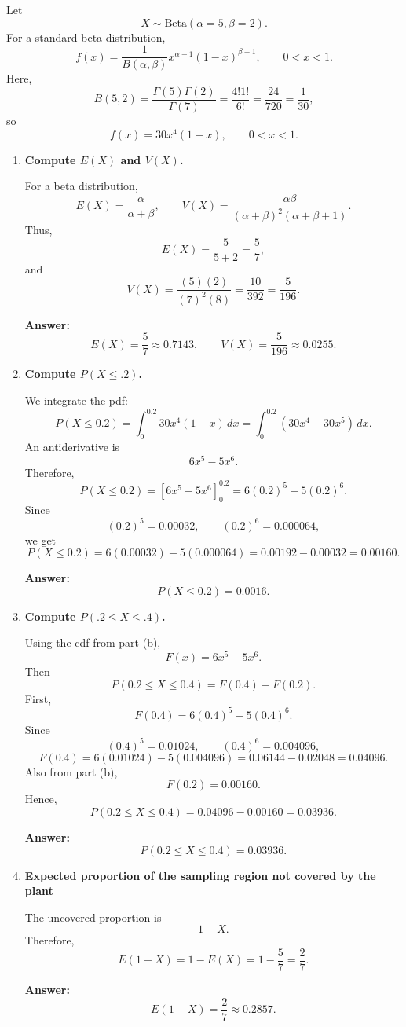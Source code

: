 \documentclass[11pt]{article}
\begin{document}
Let
\[
X\sim \text{Beta}(\alpha=5,\beta=2).
\]
For a standard beta distribution,
\[
f(x)=\frac{1}{B(\alpha,\beta)}x^{\alpha-1}(1-x)^{\beta-1}, \qquad 0<x<1.
\]
Here,
\[
B(5,2)=\frac{\Gamma(5)\Gamma(2)}{\Gamma(7)}=\frac{4!1!}{6!}=\frac{24}{720}=\frac{1}{30},
\]
so
\[
f(x)=30x^4(1-x), \qquad 0<x<1.
\]

\begin{enumerate}
    \item[(a)] \textbf{Compute $E(X)$ and $V(X)$.}

    For a beta distribution,
    \[
    E(X)=\frac{\alpha}{\alpha+\beta}, \qquad V(X)=\frac{\alpha\beta}{(\alpha+\beta)^2(\alpha+\beta+1)}.
    \]
    Thus,
    \[
    E(X)=\frac{5}{5+2}=\frac{5}{7},
    \]
    and
    \[
    V(X)=\frac{(5)(2)}{(7)^2(8)}=\frac{10}{392}=\frac{5}{196}.
    \]

    \textbf{Answer:}
    \[
    E(X)=\frac{5}{7}\approx 0.7143, \qquad V(X)=\frac{5}{196}\approx 0.0255.
    \]

    \item[(b)] \textbf{Compute $P(X\le .2)$.}

    We integrate the pdf:
    \[
    P(X\le 0.2)=\int_0^{0.2} 30x^4(1-x)\,dx
    =\int_0^{0.2} (30x^4-30x^5)\,dx.
    \]
    An antiderivative is
    \[
    6x^5-5x^6.
    \]
    Therefore,
    \[
    P(X\le 0.2)=\left[6x^5-5x^6\right]_0^{0.2}
    =6(0.2)^5-5(0.2)^6.
    \]
    Since
    \[
    (0.2)^5=0.00032,\qquad (0.2)^6=0.000064,
    \]
    we get
    \[
    P(X\le 0.2)=6(0.00032)-5(0.000064)=0.00192-0.00032=0.00160.
    \]

    \textbf{Answer:}
    \[
    P(X\le 0.2)=0.0016.
    \]

    \item[(c)] \textbf{Compute $P(.2\le X\le .4)$.}

    Using the cdf from part (b),
    \[
    F(x)=6x^5-5x^6.
    \]
    Then
    \[
    P(0.2\le X\le 0.4)=F(0.4)-F(0.2).
    \]
    First,
    \[
    F(0.4)=6(0.4)^5-5(0.4)^6.
    \]
    Since
    \[
    (0.4)^5=0.01024,\qquad (0.4)^6=0.004096,
    \]
    \[
    F(0.4)=6(0.01024)-5(0.004096)=0.06144-0.02048=0.04096.
    \]
    Also from part (b),
    \[
    F(0.2)=0.00160.
    \]
    Hence,
    \[
    P(0.2\le X\le 0.4)=0.04096-0.00160=0.03936.
    \]

    \textbf{Answer:}
    \[
    P(0.2\le X\le 0.4)=0.03936.
    \]

    \item[(d)] \textbf{Expected proportion of the sampling region not covered by the plant}

    The uncovered proportion is
    \[
    1-X.
    \]
    Therefore,
    \[
    E(1-X)=1-E(X)=1-\frac{5}{7}=\frac{2}{7}.
    \]

    \textbf{Answer:}
    \[
    E(1-X)=\frac{2}{7}\approx 0.2857.
    \]
\end{enumerate}
\end{document}
